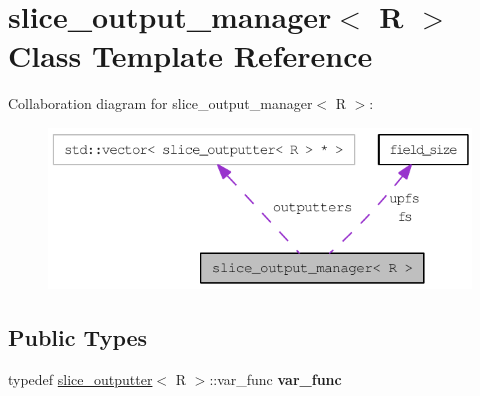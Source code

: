 \hypertarget{classslice__output__manager}{
\section{slice\_\-output\_\-manager$<$ R $>$ Class Template Reference}
\label{classslice__output__manager}
}
Collaboration diagram for slice\_\-output\_\-manager$<$ R $>$:\nopagebreak
\begin{figure}[H]
\begin{center}
\leavevmode
\includegraphics[width=336pt]{classslice__output__manager__coll__graph}
\end{center}
\end{figure}
\subsection*{Public Types}
\begin{DoxyCompactItemize}
\item 
\hypertarget{classslice__output__manager_a52e08ac6e50f8f93dd50412350c03b1a}{
typedef \hyperlink{classslice__outputter}{slice\_\-outputter}$<$ R $>$::var\_\-func {\bfseries var\_\-func}}
\label{classslice__output__manager_a52e08ac6e50f8f93dd50412350c03b1a}

\end{DoxyCompactItemize}
